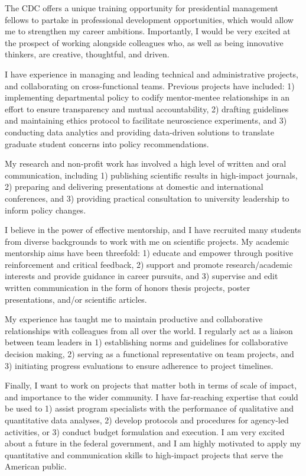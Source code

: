 \documentclass[11pt, a4paper]{maedbh-cv}
\begin{document}
\begin{cvletter}
The CDC offers a unique training opportunity for presidential management fellows to partake in professional development opportunities, which would allow me to strengthen my career ambitions. Importantly, I would be very excited at the prospect of working alongside colleagues who, as well as being innovative thinkers, are creative, thoughtful, and driven. 

I have experience in managing and leading technical and administrative projects, and collaborating on cross-functional teams. Previous projects have included: 1) implementing departmental policy to codify mentor-mentee relationships in an effort to ensure transparency and mutual accountability, 2) drafting guidelines and maintaining ethics protocol to facilitate neuroscience experiments, and 3) conducting data analytics and providing data-driven solutions to translate graduate student concerns into policy recommendations. 

	My research and non-profit work has involved a high level of written and oral communication, including 1) publishing scientific results in high-impact journals, 2) preparing and delivering presentations at domestic and international conferences, and 3) providing practical consultation to university leadership to inform policy changes. 

	I believe in the power of effective mentorship, and I have recruited many students from diverse backgrounds to work with me on scientific projects. My academic mentorship aims have been threefold: 1) educate and empower through positive reinforcement and critical feedback, 2) support and promote research/academic interests and provide guidance in career pursuits, and 3) supervise and edit written communication in the form of honors thesis projects, poster presentations, and/or scientific articles. 

	My experience has taught me to maintain productive and collaborative relationships with colleagues from all over the world. I regularly act as a liaison between team leaders in 1) establishing norms and guidelines for collaborative decision making, 2) serving as a functional representative on team projects, and 3) initiating progress evaluations to ensure adherence to project timelines.  

	Finally, I want to work on projects that matter both in terms of scale of impact, and importance to the wider community. I have far-reaching expertise that could be used to 1) assist program specialists with the performance of qualitative and quantitative data analyses, 2) develop protocols and procedures for agency-led activities, or 3) conduct budget formulation and execution. I am very excited about a future in the federal government, and I am highly motivated to apply my quantitative and communication skills to high‐impact projects that serve the American public. 

\end{cvletter}

\makeletterclosing
\end{document}
